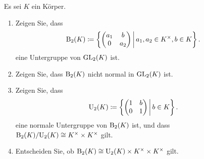 \begin{question}[subtitle = Die oberen $2 \times 2$-Matrizen]
  Es sei $K$ ein Körper.
  \begin{enumerate}
    \item
      Zeigen Sie, dass
      \[
                  \operatorname{B}_2(K)
        \coloneqq \left\{
                    \begin{pmatrix}
                      a_1 & b   \\
                      0   & a_2
                    \end{pmatrix}
                  \,\middle|\,
                    a_1, a_2 \in K^\times,
                    b \in K
                  \right\}.
      \]
      eine Untergruppe von $\operatorname{GL}_2(K)$ ist.
    \item
      Zeigen Sie, dass $\operatorname{B}_2(K)$ nicht normal in $\operatorname{GL}_2(K)$ ist.
    \item
      Zeigen Sie, dass
      \[
                  \operatorname{U}_2(K)
        \coloneqq \left\{
                    \begin{pmatrix}
                      1 & b \\
                      0 & 1
                    \end{pmatrix}
                  \,\middle|\,
                    b \in K
                  \right\}.
      \]
      eine normale Untergruppe von $\operatorname{B}_2(K)$ ist, und dass $\operatorname{B}_2(K)/{\operatorname{U}_2(K)} \cong K^\times \times K^\times$ gilt.
    \item
      Entscheiden Sie, ob $\operatorname{B}_2(K) \cong \operatorname{U}_2(K) \times K^\times \times K^\times$ gilt.
  \end{enumerate}
\end{question}


